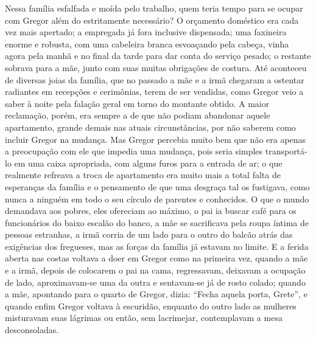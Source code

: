 Nessa família esfalfada e moída pelo trabalho, quem teria tempo para se
ocupar com Gregor além do estritamente necessário? O orçamento doméstico
era cada vez mais apertado; a empregada já fora inclusive dispensada; uma
faxineira enorme e robusta, com uma cabeleira branca esvoaçando pela
cabeça, vinha agora pela manhã e no final da tarde para dar conta do
serviço pesado; o restante sobrava para a mãe, junto com suas muitas
obrigações de costura. Até aconteceu de diversas joias da família, que no
passado a mãe e a irmã chegaram a ostentar radiantes em recepções e
cerimônias, terem de ser vendidas, como Gregor veio a saber à noite pela
falação geral em torno do montante obtido. A maior reclamação, porém, era
sempre a de que não podiam abandonar aquele apartamento, grande demais nas
atuais circunstâncias, por não saberem como incluir Gregor na mudança. Mas
Gregor percebia muito bem que não era apenas a preocupação com ele que
impedia uma mudança, pois seria simples transportá-lo em uma caixa
apropriada, com alguns furos para a entrada de ar; o que realmente
refreava a troca de apartamento era muito mais a total falta de esperanças
da família e o pensamento de que uma desgraça tal os fustigava, como nunca
a ninguém em todo o seu círculo de parentes e conhecidos. O que o mundo
demandava aos
pobres, eles ofereciam ao máximo,
o pai ia buscar café para
os funcionários do baixo escalão do banco, a mãe se sacrificava pela roupa
íntima de pessoas estranhas, a irmã corria de um lado para o outro do
balcão atrás das exigências dos fregueses, mas as forças da família já
estavam no limite. E a ferida aberta nas costas voltava a doer em Gregor
como na primeira vez, quando a mãe e a irmã, depois de colocarem o pai na
cama, regressavam, deixavam a ocupação de lado, aproximavam-se uma da
outra e sentavam-se já de rosto colado; quando a mãe, apontando para
o quarto de Gregor, dizia: “Fecha aquela porta, Grete”, e quando enfim
Gregor voltava à escuridão, enquanto do outro lado as mulheres misturavam
suas lágrimas ou então, sem lacrimejar, contemplavam a mesa desconsoladas.

